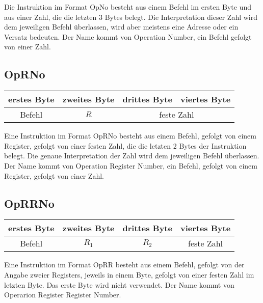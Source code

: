 Die Instruktion im Format OpNo besteht aus einem Befehl im ersten Byte und aus
einer Zahl, die die letzten 3 Bytes belegt. Die Interpretation dieser Zahl wird
dem jeweiligen Befehl überlassen, wird aber meistens eine Adresse oder ein
Versatz bedeuten.
Der Name kommt von \glqq Operation Number\grqq, ein Befehl gefolgt von einer
Zahl.


\subsection{OpRNo}

\begin{center}
  \begin{tabular}{|*{4}{c|}}
    \hline
    erstes Byte   & zweites Byte  & drittes Byte  & viertes Byte
    \\\hline\hline
    Befehl        & $R$ & \multicolumn{2}{c|}{feste Zahl}
    \\\hline
  \end{tabular}
\end{center}

Eine Instruktion im Format OpRNo besteht aus einem Befehl, gefolgt von einem
Register, gefolgt von einer festen Zahl, die die letzten 2 Bytes der Instruktion
belegt. Die genaue Interpretation der Zahl wird dem jeweiligen Befehl
überlassen.
Der Name kommt von \glqq Operation Register Number\grqq, ein Befehl, gefolgt von
einem Register, gefolgt von einer Zahl.



\subsection{OpRRNo}

\begin{center}
  \begin{tabular}{|*{4}{c|}}
    \hline
    erstes Byte   & zweites Byte  & drittes Byte  & viertes Byte
    \\\hline\hline
    Befehl        & $R_{1}$       & $R_{2}$ & feste Zahl
    \\\hline
  \end{tabular}
\end{center}
Eine Instruktion im Format OpRR besteht aus einem Befehl, gefolgt von der
Angabe zweier Registers, jeweils in einem Byte, gefolgt von einer festen Zahl
im letzten Byte. Das erste Byte wird nicht verwendet.
Der Name kommt von \glqq Operarion Register Register Number\grqq.




